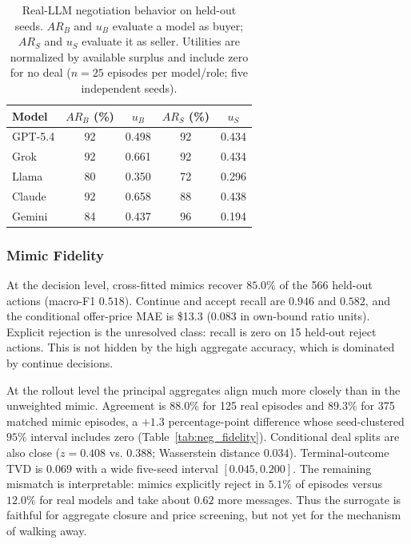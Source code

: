 \documentclass[conference]{IEEEtran}
\begin{document}
\begin{table}[htbp]
\caption{Real-LLM negotiation behavior on held-out seeds. $AR_B$ and $u_B$ evaluate a model as buyer; $AR_S$ and $u_S$ evaluate it as seller. Utilities are normalized by available surplus and include zero for no deal ($n=25$ episodes per model/role; five independent seeds).}
\label{tab:neg_behavior}
\centering
\begin{tabular}{lcccc}
\hline
Model & $AR_B$ (\%) & $u_B$ & $AR_S$ (\%) & $u_S$ \\
\hline
GPT-5.4 & 92 & 0.498 & 92 & 0.434 \\
Grok    & 92 & 0.661 & 92 & 0.434 \\
Llama   & 80 & 0.350 & 72 & 0.296 \\
Claude  & 92 & 0.658 & 88 & 0.438 \\
Gemini  & 84 & 0.437 & 96 & 0.194 \\
\hline
\end{tabular}
\end{table}

\subsubsection{Mimic Fidelity}
\label{sec:neg-fidelity}

At the decision level, cross-fitted mimics recover $85.0\%$ of the 566 held-out actions (macro-F1 $0.518$). Continue and accept recall are $0.946$ and $0.582$, and the conditional offer-price MAE is \$13.3 (0.083 in own-bound ratio units). Explicit rejection is the unresolved class: recall is zero on 15 held-out reject actions. This is not hidden by the high aggregate accuracy, which is dominated by continue decisions.

At the rollout level the principal aggregates align much more closely than in the unweighted mimic. Agreement is $88.0\%$ for 125 real episodes and $89.3\%$ for 375 matched mimic episodes, a $+1.3$ percentage-point difference whose seed-clustered $95\%$ interval includes zero (Table~\ref{tab:neg_fidelity}). Conditional deal splits are also close ($z=0.408$ vs. $0.388$; Wasserstein distance $0.034$). Terminal-outcome TVD is $0.069$ with a wide five-seed interval $[0.045,0.200]$. The remaining mismatch is interpretable: mimics explicitly reject in $5.1\%$ of episodes versus $12.0\%$ for real models and take about $0.62$ more messages. Thus the surrogate is faithful for aggregate closure and price screening, but not yet for the mechanism of walking away.
\end{document}
